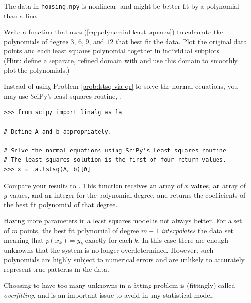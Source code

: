 \begin{problem} %
The data in \texttt{housing.npy} is nonlinear, and might be better fit by a polynomial than a line.

Write a function that uses (\ref{eq:polynomial-least-squares}) to calculate the polynomials of degree $3$, $6$, $9$, and $12$ that best fit the data.
Plot the original data points and each least squares polynomial together in individual subplots.
\\(Hint: define a separate, refined domain with  and use this domain to smoothly plot the polynomials.)

Instead of using Problem \ref{prob:lstsq-via-qr} to solve the normal equations, you may use SciPy's least squares routine, .

\begin{lstlisting}
>>> from scipy import linalg as la

# Define A and b appropriately.

# Solve the normal equations using SciPy's least squares routine.
# The least squares solution is the first of four return values.
>>> x = la.lstsq(A, b)[0]
\end{lstlisting}

Compare your results to .
This function receives an array of $x$ values, an array of $y$ values, and an integer for the polynomial degree, and returns the coefficients of the best fit polynomial of that degree.

\label{prob:polynomial-least-squares}
\end{problem}

\begin{warn} %
Having more parameters in a least squares model is not always better.
For a set of $m$ points, the best fit polynomial of degree $m-1$ \emph{interpolates} the data set, meaning that $p(x_k) = y_k$ exactly for each $k$.
In this case there are enough unknowns that the system is no longer overdetermined.
However, such polynomials are highly subject to numerical errors and are unlikely to accurately represent true patterns in the data.

Choosing to have too many unknowns in a fitting problem is (fittingly) called \emph{overfitting}, and is an important issue to avoid in any statistical model.
\end{warn}

